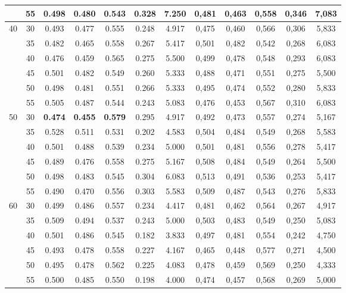 \documentclass{article}
\begin{document}
\begin{table}[!h]
\begin{tabular}{|c|c||c|c|c|c|c||c|c|c|c|c|}
  & 55 & 0.498 & 0.480 & 0.543 & 0.328  & 7.250                & 0,481 & 0,463 & 0,558 & 0,346 & 7,083  \\ \hline     
 \multirow{6}{*}{40} 
  & 30 & 0.493 & 0.477 & 0.555 & 0.248  & 4.917                & 0,475 & 0,460 & 0,566 & 0,306 & 5,833  \\ \cline{2-12} 
  & 35 & 0.482 & 0.465 & 0.558 & 0.267  & 5.417                & 0,501 & 0,482 & 0,542 & 0,268 & 6,083  \\ \cline{2-12} 
  & 40 & 0.476 & 0.459 & 0.565 & 0.275  & 5.500                & 0,499 & 0,478 & 0,548 & 0,293 & 6,083  \\ \cline{2-12} 
  & 45 & 0.501 & 0.482 & 0.549 & 0.260  & 5.333                & 0,488 & 0,471 & 0,551 & 0,275 & 5,500  \\ \cline{2-12} 
  & 50 & 0.498 & 0.481 & 0.551 & 0.266  & 5.333                & 0,495 & 0,474 & 0,552 & 0,280 & 5,833  \\ \cline{2-12} 
  & 55 & 0.505 & 0.487 & 0.544 & 0.243  & 5.083                & 0,476 & 0,453 & 0,567 & 0,310 & 6,083  \\ \hline      
 \multirow{6}{*}{50} 
 & 30 & \cellcolor{gray!20} \textbf{0.474} & \cellcolor{gray!20} \textbf{0.455} & \cellcolor{gray!20} \textbf{0.579} & 0.295 & 4.917 & 0,492 & 0,473 & 0,557 & 0,274 & 5,167  \\ \cline{2-12}
  & 35 & 0.528 & 0.511 & 0.531 & 0.202  & 4.583                & 0,504 & 0,484 & 0,549 & 0,268 & 5,583  \\ \cline{2-12} 
  & 40 & 0.501 & 0.488 & 0.539 & 0.234  & 5.000                & 0,501 & 0,481 & 0,556 & 0,278 & 5,417  \\ \cline{2-12} 
  & 45 & 0.489 & 0.476 & 0.558 & 0.275  & 5.167                & 0,508 & 0,484 & 0,549 & 0,264 & 5,500  \\ \cline{2-12} 
  & 50 & 0.498 & 0.483 & 0.545 & 0.304  & 6.083                & 0,513 & 0,491 & 0,536 & 0,253 & 5,417  \\ \cline{2-12} 
  & 55 & 0.490 & 0.470 & 0.556 & 0.303  & 5.583                & 0,509 & 0,487 & 0,543 & 0,276 & 5,833  \\ \hline      
 \multirow{6}{*}{60}                           
  & 30 & 0.499 & 0.486 & 0.557 & 0.234  & 4.417                & 0,481 & 0,462 & 0,564 & 0,267 & 4,917  \\ \cline{2-12} 
  & 35 & 0.509 & 0.494 & 0.537 & 0.243  & 5.000                & 0,503 & 0,483 & 0,549 & 0,250 & 5,083  \\ \cline{2-12} 
  & 40 & 0.501 & 0.486 & 0.545 & 0.182  & 3.833                & 0,497 & 0,481 & 0,554 & 0,242 & 4,750  \\ \cline{2-12} 
  & 45 & 0.493 & 0.478 & 0.558 & 0.227  & 4.167                & 0,465 & 0,448 & 0,577 & 0,271 & 4,500  \\ \cline{2-12} 
  & 50 & 0.495 & 0.478 & 0.562 & 0.225  & 4.083                & 0,478 & 0,459 & 0,569 & 0,250 & 4,333  \\ \cline{2-12} 
  & 55 & 0.500 & 0.485 & 0.550 & 0.198  & 4.000                & 0,474 & 0,457 & 0,568 & 0,269 & 5,000  \\ \hline      


\end{tabular}
\end{table}
\end{document}
